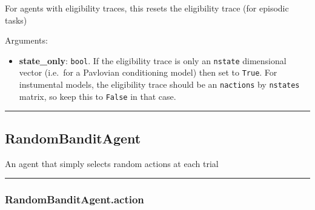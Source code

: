 \begin{Shaded}
\begin{Highlighting}[]
\OperatorTok{=}\NormalTok{)}
\end{Highlighting}
\end{Shaded}

For agents with eligibility traces, this resets the eligibility trace
(for episodic tasks)

Arguments:

\begin{itemize}
\tightlist
\item
  \textbf{state\_only}: \texttt{bool}. If the eligibility trace is only
  an \texttt{nstate} dimensional vector (i.e.~for a Pavlovian
  conditioning model) then set to \texttt{True}. For instumental models,
  the eligibility trace should be an \texttt{nactions} by
  \texttt{nstates} matrix, so keep this to \texttt{False} in that case.
\end{itemize}

\begin{center}\rule{0.5\linewidth}{\linethickness}\end{center}

\subsection{RandomBanditAgent}\label{randombanditagent}

\begin{Shaded}
\begin{Highlighting}[]
\end{Highlighting}
\end{Shaded}

An agent that simply selects random actions at each trial

\begin{center}\rule{0.5\linewidth}{\linethickness}\end{center}

\subsubsection{RandomBanditAgent.action}\label{randombanditagent.action}

\begin{Shaded}
\begin{Highlighting}[]
\end{Highlighting}
\end{Shaded}

